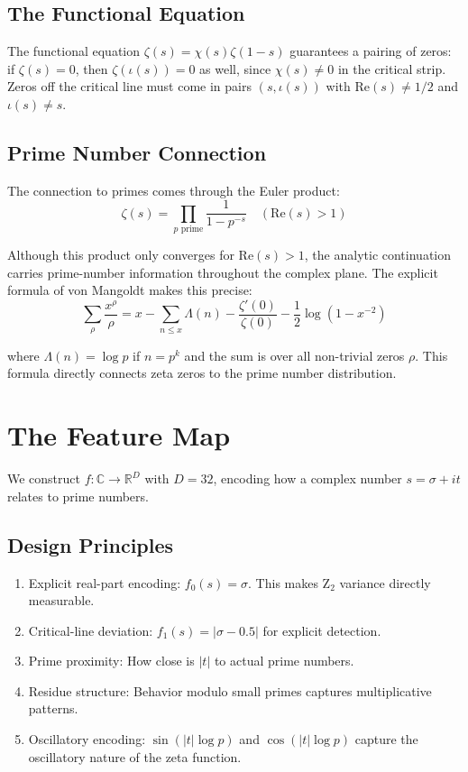 \documentclass[11pt,a4paper]{article}
\begin{document}
\subsection{The Functional Equation}

The functional equation $\zeta(s) = \chi(s)\zeta(1-s)$ guarantees a pairing of zeros: if $\zeta(s) = 0$, then $\zeta(\iota(s)) = 0$ as well, since $\chi(s) \neq 0$ in the critical strip. Zeros off the critical line must come in pairs $(s, \iota(s))$ with $\mathrm{Re}(s) \neq 1/2$ and $\iota(s) \neq s$.

\subsection{Prime Number Connection}

The connection to primes comes through the Euler product:
$$\zeta(s) = \prod_{p \text{ prime}} \frac{1}{1 - p^{-s}} \quad (\mathrm{Re}(s) > 1)$$

Although this product only converges for $\mathrm{Re}(s) > 1$, the analytic continuation carries prime-number information throughout the complex plane. The explicit formula of von Mangoldt makes this precise:
$$\sum_{\rho} \frac{x^\rho}{\rho} = x - \sum_{n \le x} \Lambda(n) - \frac{\zeta'(0)}{\zeta(0)} - \frac{1}{2}\log(1-x^{-2})$$

where $\Lambda(n) = \log p$ if $n = p^k$ and the sum is over all non-trivial zeros $\rho$. This formula directly connects zeta zeros to the prime number distribution.

\section{The Feature Map}

We construct $f: \mathbb{C} \to \mathbb{R}^{D}$ with $D=32$, encoding how a complex number $s = \sigma + it$ relates to prime numbers.

\subsection{Design Principles}

\begin{enumerate}[nosep]
\item Explicit real-part encoding: $f_0(s) = \sigma$. This makes Z$_2$ variance directly measurable.
\item Critical-line deviation: $f_1(s) = |\sigma - 0.5|$ for explicit detection.
\item Prime proximity: How close is $|t|$ to actual prime numbers.
\item Residue structure: Behavior modulo small primes captures multiplicative patterns.
\item Oscillatory encoding: $\sin(|t|\log p)$ and $\cos(|t|\log p)$ capture the oscillatory nature of the zeta function.
\end{enumerate}
\end{document}
